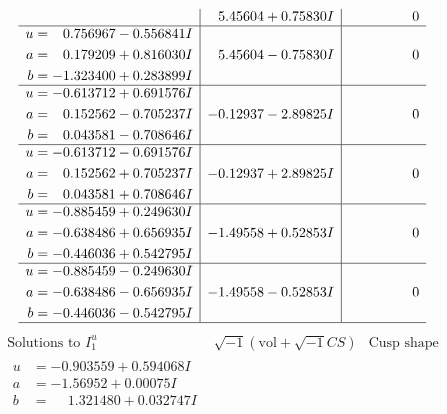 \documentclass[1p]{elsarticle_modified}
\theoremstyle{definition}
\newcommand{\I}{\sqrt{-1}}
\begin{document}
$$\begin{array}{c|c|c}
 & \phantom{-}5.45604 + 0.75830 I & \phantom{-0.000000 } 0 \\ \hline\begin{aligned}
u &= \phantom{-}0.756967 - 0.556841 I \\
a &= \phantom{-}0.179209 + 0.816030 I \\
b &= -1.323400 + 0.283899 I\end{aligned}
 & \phantom{-}5.45604 - 0.75830 I & \phantom{-0.000000 } 0 \\ \hline\begin{aligned}
u &= -0.613712 + 0.691576 I \\
a &= \phantom{-}0.152562 - 0.705237 I \\
b &= \phantom{-}0.043581 - 0.708646 I\end{aligned}
 & -0.12937 - 2.89825 I & \phantom{-0.000000 } 0 \\ \hline\begin{aligned}
u &= -0.613712 - 0.691576 I \\
a &= \phantom{-}0.152562 + 0.705237 I \\
b &= \phantom{-}0.043581 + 0.708646 I\end{aligned}
 & -0.12937 + 2.89825 I & \phantom{-0.000000 } 0 \\ \hline\begin{aligned}
u &= -0.885459 + 0.249630 I \\
a &= -0.638486 + 0.656935 I \\
b &= -0.446036 + 0.542795 I\end{aligned}
 & -1.49558 + 0.52853 I & \phantom{-0.000000 } 0 \\ \hline\begin{aligned}
u &= -0.885459 - 0.249630 I \\
a &= -0.638486 - 0.656935 I \\
b &= -0.446036 - 0.542795 I\end{aligned}
 & -1.49558 - 0.52853 I & \phantom{-0.000000 } 0\\
 \hline 
 \end{array}$$\newpage$$\begin{array}{c|c|c}  
\text{Solutions to }I^u_{1}& \I (\text{vol} + \sqrt{-1}CS) & \text{Cusp shape}\\
 \hline 
\begin{aligned}
u &= -0.903559 + 0.594068 I \\
a &= -1.56952 + 0.00075 I \\
b &= \phantom{-}1.321480 + 0.032747 I\end{aligned}

\end{array}$$
\end{document}
